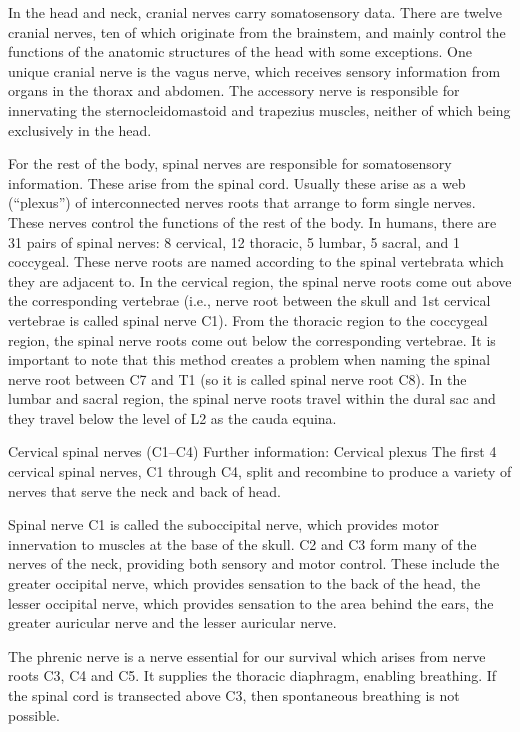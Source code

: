 \documentclass[]{book}
\begin{document}
In the head and neck, cranial nerves carry somatosensory data. There are twelve cranial nerves, ten of which originate from the brainstem, and mainly control the functions of the anatomic structures of the head with some exceptions. One unique cranial nerve is the vagus nerve, which receives sensory information from organs in the thorax and abdomen. The accessory nerve is responsible for innervating the sternocleidomastoid and trapezius muscles, neither of which being exclusively in the head.

For the rest of the body, spinal nerves are responsible for somatosensory information. These arise from the spinal cord. Usually these arise as a web (``plexus'') of interconnected nerves roots that arrange to form single nerves. These nerves control the functions of the rest of the body. In humans, there are 31 pairs of spinal nerves: 8 cervical, 12 thoracic, 5 lumbar, 5 sacral, and 1 coccygeal. These nerve roots are named according to the spinal vertebrata which they are adjacent to. In the cervical region, the spinal nerve roots come out above the corresponding vertebrae (i.e., nerve root between the skull and 1st cervical vertebrae is called spinal nerve C1). From the thoracic region to the coccygeal region, the spinal nerve roots come out below the corresponding vertebrae. It is important to note that this method creates a problem when naming the spinal nerve root between C7 and T1 (so it is called spinal nerve root C8). In the lumbar and sacral region, the spinal nerve roots travel within the dural sac and they travel below the level of L2 as the cauda equina.

Cervical spinal nerves (C1--C4)
Further information: Cervical plexus
The first 4 cervical spinal nerves, C1 through C4, split and recombine to produce a variety of nerves that serve the neck and back of head.

Spinal nerve C1 is called the suboccipital nerve, which provides motor innervation to muscles at the base of the skull. C2 and C3 form many of the nerves of the neck, providing both sensory and motor control. These include the greater occipital nerve, which provides sensation to the back of the head, the lesser occipital nerve, which provides sensation to the area behind the ears, the greater auricular nerve and the lesser auricular nerve.

The phrenic nerve is a nerve essential for our survival which arises from nerve roots C3, C4 and C5. It supplies the thoracic diaphragm, enabling breathing. If the spinal cord is transected above C3, then spontaneous breathing is not possible.
\end{document}
